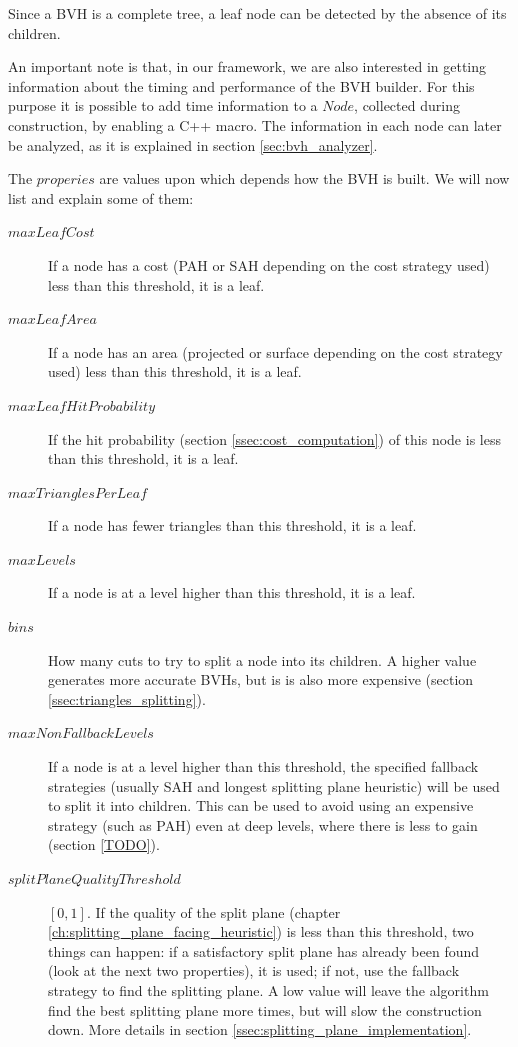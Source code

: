 \documentclass{PoliMi_MasterThesis}
\begin{document}
Since a BVH is a complete tree, a leaf node can be detected by the absence of its children.

An important note is that, in our framework, we are also interested in getting information about the timing and performance of the BVH builder. For this purpose it is possible to add time information to a $Node$, collected during construction, by enabling a C++ macro. The information in each node can later be analyzed, as it is explained in section \ref{sec:bvh_analyzer}.

The $properies$ are values upon which depends how the BVH is built. We will now list and explain some of them:
\begin{description} 
	\item[\boldmath$maxLeafCost$] If a node has a cost (PAH or SAH depending on the cost strategy used) less than this threshold, it is a leaf.
	\item[\boldmath$maxLeafArea$] If a node has an area (projected or surface depending on the cost strategy used) less than this threshold, it is a leaf.
	\item[\boldmath$maxLeafHitProbability$] If the hit probability (section \ref{ssec:cost_computation}) of this node is less than this threshold, it is a leaf.
	\item[\boldmath$maxTrianglesPerLeaf$] If a node has fewer triangles than this threshold, it is a leaf.
	\item[\boldmath$maxLevels$] If a node is at a level higher than this threshold, it is a leaf.
	\item[\boldmath$bins$] How many cuts to try to split a node into its children. A higher value generates more accurate BVHs, but is is also more expensive (section \ref{ssec:triangles_splitting}).
	\item[\boldmath$maxNonFallbackLevels$] If a node is at a level higher than this threshold, the specified fallback strategies (usually SAH and longest splitting plane heuristic) will be used to split it into children. This can be used to avoid using an expensive strategy (such as PAH) even at deep levels, where there is less to gain (section \ref{TODO}).
	\item[\boldmath$splitPlaneQualityThreshold$] $[0, 1]$. If the quality of the split plane (chapter \ref{ch:splitting_plane_facing_heuristic}) is less than this threshold, two things can happen: if a satisfactory split plane has already been found (look at the next two properties), it is used; if not, use the fallback strategy to find the splitting plane. A low value will leave the algorithm find the best splitting plane more times, but will slow the construction down. More details in section \ref{ssec:splitting_plane_implementation}.

\end{description}
\end{document}
